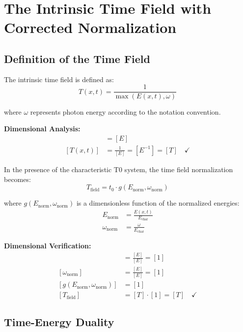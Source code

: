 \documentclass[12pt,a4paper]{report}
\newcommand{\tzero}{t_0}                  %
\begin{document}
	\section{The Intrinsic Time Field with Corrected Normalization}
	
	\subsection{Definition of the Time Field}
	
	The intrinsic time field is defined as:
	\begin{equation}
		T(x,t) = \frac{1}{\max(E(x,t), \omega)}
		\label{eq:time_field}
	\end{equation}
	
	where $\omega$ represents photon energy according to the notation convention.
	
	\textbf{Dimensional Analysis:}
	\begin{align}
		[\max(E(x,t), \omega)] &= [E] \\
		[T(x,t)] &= \frac{1}{[E]} = [E^{-1}] = [T] \quad \checkmark
	\end{align}
	
	In the presence of the characteristic T0 system, the time field normalization becomes:
	\begin{equation}
		\boxed{T_{\text{field}} = \tzero \cdot g(E_{\text{norm}}, \omega_{\text{norm}})}
		\label{eq:time_field_normalized}
	\end{equation}
	
	where $g(E_{\text{norm}}, \omega_{\text{norm}})$ is a dimensionless function of the normalized energies:
	\begin{align}
		E_{\text{norm}} &= \frac{E(x,t)}{E_{\text{char}}} \\
		\omega_{\text{norm}} &= \frac{\omega}{E_{\text{char}}}
	\end{align}
	
	\textbf{Dimensional Verification:}
	\begin{align}
		[E_{\text{norm}}] &= \frac{[E]}{[E]} = [1] \\
		[\omega_{\text{norm}}] &= \frac{[E]}{[E]} = [1] \\
		[g(E_{\text{norm}}, \omega_{\text{norm}})] &= [1] \\
		[T_{\text{field}}] &= [T] \cdot [1] = [T] \quad \checkmark
	\end{align}
	
	\subsection{Time-Energy Duality}
	
\end{document}
